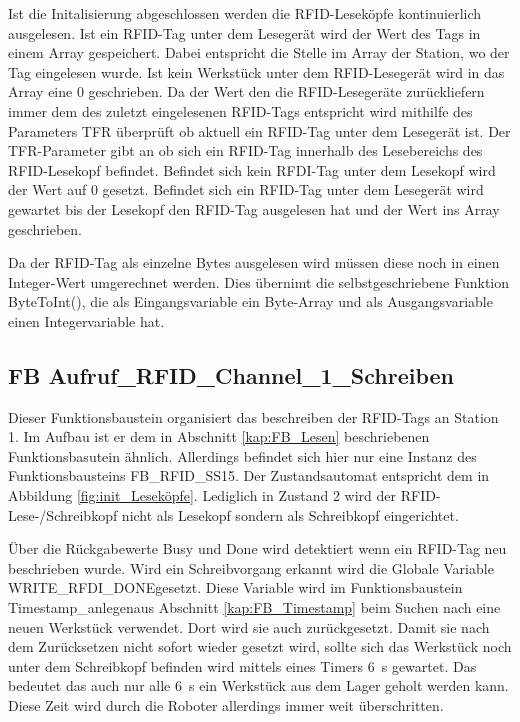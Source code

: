 Ist die Initalisierung abgeschlossen werden die RFID-Leseköpfe kontinuierlich ausgelesen. Ist ein RFID-Tag unter dem Lesegerät wird der Wert des Tags in einem Array gespeichert. Dabei entspricht die Stelle im Array der Station, wo der Tag eingelesen wurde. Ist kein Werkstück unter dem RFID-Lesegerät wird in das Array eine 0 geschrieben. Da der Wert den die RFID-Lesegeräte zurückliefern immer dem des zuletzt eingelesenen RFID-Tags entspricht wird mithilfe des Parameters TFR überprüft ob aktuell ein RFID-Tag unter dem Lesegerät ist. Der TFR-Parameter gibt an ob sich ein RFID-Tag innerhalb des Lesebereichs des RFID-Lesekopf befindet. Befindet sich kein RFDI-Tag unter dem Lesekopf wird der Wert auf 0 gesetzt. Befindet sich ein RFID-Tag unter dem Lesegerät wird gewartet bis der Lesekopf den RFID-Tag ausgelesen hat und der Wert ins Array geschrieben. 

Da der RFID-Tag als einzelne Bytes ausgelesen wird müssen diese noch in einen Integer-Wert umgerechnet werden. Dies übernimt die selbstgeschriebene Funktion ByteToInt(), die als Eingangsvariable ein Byte-Array und als Ausgangsvariable einen Integervariable hat.
\subsection{FB Aufruf\_RFID\_Channel\_1\_Schreiben}
Dieser Funktionsbaustein organisiert das beschreiben der RFID-Tags an Station 1. Im Aufbau ist er dem in Abschnitt \ref{kap:FB_Lesen} beschriebenen Funktionsbasutein ähnlich. Allerdings befindet sich hier nur eine Instanz des Funktionsbausteins \glqq FB\_RFID\_SS15\grqq . Der Zustandsautomat entspricht dem in Abbildung \ref{fig:init_Leseköpfe}. Lediglich in Zustand 2 wird der RFID-Lese-/Schreibkopf nicht als Lesekopf sondern als Schreibkopf eingerichtet. 

Über die Rückgabewerte Busy und Done wird detektiert wenn ein RFID-Tag neu beschrieben wurde. Wird ein Schreibvorgang erkannt wird die Globale Variable \glqq WRITE\_RFDI\_DONE\grqq gesetzt. Diese Variable wird im Funktionsbaustein \glqq Timestamp\_anlegen\grqq aus Abschnitt \ref{kap:FB_Timestamp} beim Suchen nach eine neuen Werkstück verwendet. Dort wird sie auch zurückgesetzt. Damit sie nach dem Zurücksetzen nicht sofort wieder gesetzt wird, sollte sich das Werkstück noch unter dem Schreibkopf befinden wird mittels eines Timers \SI{6}{\second} gewartet. Das bedeutet das auch nur alle  \SI{6}{\second} ein Werkstück aus dem Lager geholt werden kann. Diese Zeit wird durch die Roboter allerdings immer weit überschritten.

